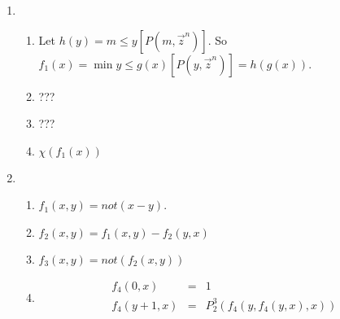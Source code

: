 \documentclass[10pt]{article}
\begin{document}
\begin{enumerate}
\item %
  \begin{enumerate}
    \item 
      Let $h(y) = m \le y[P(m, \vec{z}^n)]$.  So
      $f_1(x) = \min y \le g(x)[P(y, \vec{z}^n)] = h(g(x))$.
    \item ???
    \item ???
    \item
      $\chi(f_1(x))$
  \end{enumerate}

\item %
  \begin{enumerate}
    \item $f_1(x, y) = not(x - y)$.
    \item $f_2(x, y) = f_1(x, y) - f_2(y, x)$
    \item $f_3(x, y) = not(f_2(x, y))$
    \item 
      \begin{eqnarray*}
        f_4(0, x)     & = & 1 \\
        f_4(y + 1, x) & = & P_2^3(f_4(y, f_4(y, x), x)) \\
      \end{eqnarray*}
  \end{enumerate}

\end{enumerate}
\end{document}

